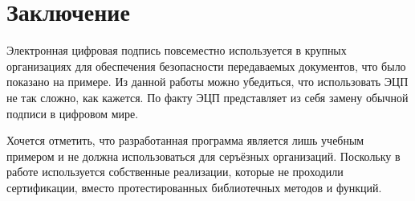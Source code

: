 \section*{Заключение}

Электронная цифровая подпись повсеместно используется в крупных организациях для обеспечения безопасности передаваемых документов, что было показано на примере.
Из данной работы можно убедиться, что использовать ЭЦП не так сложно, как кажется.
По факту ЭЦП представляет из себя замену обычной подписи в цифровом мире.

Хочется отметить, что разработанная программа является лишь учебным примером и не должна использоваться для серъёзных организаций.
Поскольку в работе используется собственные реализации, которые не проходили сертификации, вместо протестированных библиотечных методов и функций.